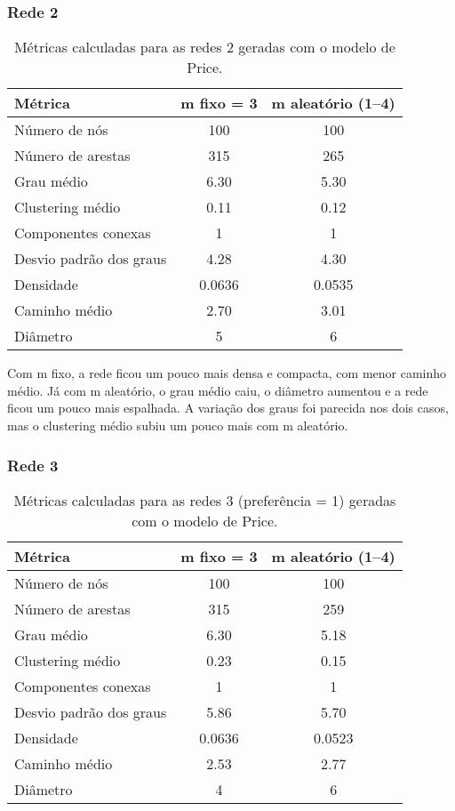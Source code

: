 \documentclass[a4paper]{article}
\begin{document}
\subsubsection{Rede 2}
\begin{table}[h]
\centering
\begin{tabular}{|l|c|c|}
\hline
\textbf{Métrica} & \textbf{m fixo = 3} & \textbf{m aleatório (1–4)} \\
\hline
Número de nós & 100 & 100 \\
Número de arestas & 315 & 265 \\
Grau médio & 6.30 & 5.30 \\
Clustering médio & 0.11 & 0.12 \\
Componentes conexas & 1 & 1 \\
Desvio padrão dos graus & 4.28 & 4.30 \\
Densidade & 0.0636 & 0.0535 \\
Caminho médio & 2.70 & 3.01 \\
Diâmetro & 5 & 6 \\
\hline
\end{tabular}
\caption{Métricas calculadas para as redes 2 geradas com o modelo de Price.}
\end{table}

Com m fixo, a rede ficou um pouco mais densa e compacta, com menor caminho médio. Já com m aleatório, o grau médio caiu, o diâmetro aumentou e a rede ficou um pouco mais espalhada. A variação dos graus foi parecida nos dois casos, mas o clustering médio subiu um pouco mais com m aleatório.

\subsubsection{Rede 3}
\begin{table}[h]
\centering
\begin{tabular}{|l|c|c|}
\hline
\textbf{Métrica} & \textbf{m fixo = 3} & \textbf{m aleatório (1–4)} \\
\hline
Número de nós & 100 & 100 \\
Número de arestas & 315 & 259 \\
Grau médio & 6.30 & 5.18 \\
Clustering médio & 0.23 & 0.15 \\
Componentes conexas & 1 & 1 \\
Desvio padrão dos graus & 5.86 & 5.70 \\
Densidade & 0.0636 & 0.0523 \\
Caminho médio & 2.53 & 2.77 \\
Diâmetro & 4 & 6 \\
\hline
\end{tabular}
\caption{Métricas calculadas para as redes 3 (preferência = 1) geradas com o modelo de Price.}
\end{table}
\end{document}
